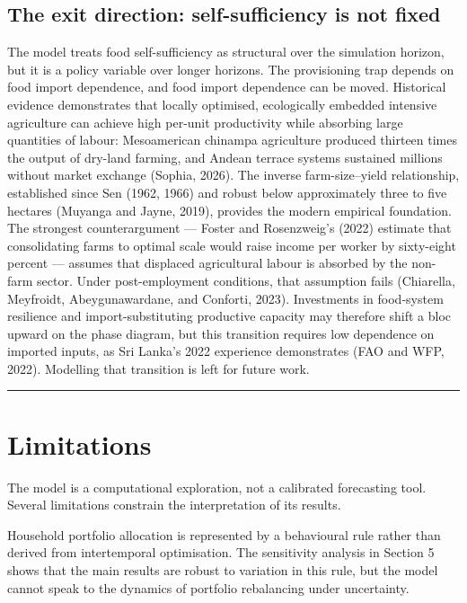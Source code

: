 \documentclass[preprint,review,12pt]{elsarticle}
\begin{document}
\subsection{The exit direction: self-sufficiency is not fixed}

The model treats food self-sufficiency as structural over the simulation
horizon, but it is a policy variable over longer horizons. The
provisioning trap depends on food import dependence, and food import
dependence can be moved. Historical evidence demonstrates that locally
optimised, ecologically embedded intensive agriculture can achieve high
per-unit productivity while absorbing large quantities of labour:
Mesoamerican chinampa agriculture produced thirteen times the output of
dry-land farming, and Andean terrace systems sustained millions without
market exchange (Sophia, 2026). The inverse farm-size--yield
relationship, established since Sen (1962, 1966) and robust below
approximately three to five hectares (Muyanga and Jayne, 2019), provides
the modern empirical foundation. The strongest counterargument ---
Foster and Rosenzweig's (2022) estimate that consolidating farms to
optimal scale would raise income per worker by sixty-eight percent ---
assumes that displaced agricultural labour is absorbed by the non-farm
sector. Under post-employment conditions, that assumption fails
(Chiarella, Meyfroidt, Abeygunawardane, and Conforti, 2023). Investments
in food-system resilience and import-substituting productive capacity
may therefore shift a bloc upward on the phase diagram, but this
transition requires low dependence on imported inputs, as Sri Lanka's
2022 experience demonstrates (FAO and WFP, 2022). Modelling that
transition is left for future work.

\begin{center}\rule{0.5\linewidth}{0.5pt}\end{center}

\section{Limitations}

The model is a computational exploration, not a calibrated forecasting
tool. Several limitations constrain the interpretation of its results.

Household portfolio allocation is represented by a behavioural rule
rather than derived from intertemporal optimisation. The sensitivity
analysis in Section 5 shows that the main results are robust to
variation in this rule, but the model cannot speak to the dynamics of
portfolio rebalancing under uncertainty.
\end{document}
